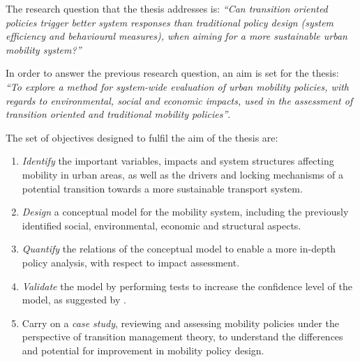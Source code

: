 \documentclass[a4paper,fontsize=11pt,bibliography=totoc]{scrartcl}
\begin{document}
The research question that the thesis addresses is: \textit{``Can transition oriented policies trigger better system responses than traditional policy design (system efficiency and behavioural measures), when aiming for a more sustainable urban mobility system?''}

In order to answer the previous research question, an aim is set for the thesis: \textit{``To explore a method for system-wide evaluation of urban mobility policies, with regards to environmental, social and economic impacts, used in the assessment of transition oriented and traditional mobility policies''}.

The set of objectives designed to fulfil the aim of the thesis are:
\begin{enumerate}[label=(\alph*)]
	\item \textit{Identify} the important variables, impacts and system structures affecting mobility in urban areas, as well as the drivers and locking mechanisms of a potential transition towards a more sustainable transport system.
	\item \textit{Design} a conceptual model for the mobility system, including the previously identified social, environmental, economic and structural aspects.
	\item \textit{Quantify} the relations of the conceptual model to enable a more in-depth policy analysis, with respect to impact assessment.
	\item \textit{Validate} the model by performing tests to increase the confidence level of the model, as suggested by \textcite{forrester1978_TestsBuildingConfidence,qudrat-ullah2010_Howdostructural}.
	\item Carry on a \textit{case study}, reviewing and assessing mobility policies under the perspective of transition management theory, to understand the differences and potential for improvement in mobility policy design.
\end{enumerate}
\end{document}
